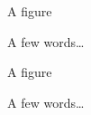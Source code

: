 \documentclass[a4paper,twocolumn]{article}
\begin{document}
\blindtext
\begin{figure}[htpb]
  \centering A figure
  \caption{A few words\ldots}
\end{figure}
\blindtext

\clearpage
\begin{figure}[htpb]
  \centering A figure
  \caption{A few words\ldots}
\end{figure}
\end{document}
